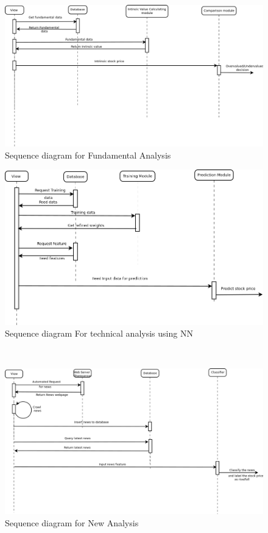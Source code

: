 ~

\begin{figure}[H]\centering
  \includegraphics[width=\textwidth]{fig/fundamental}
  \caption{Sequence diagram for Fundamental Analysis}
  \label{fig:Fundamental}
\end{figure}

\begin{figure}[h!]
  \includegraphics[width=\textwidth]{fig/StockPredictionusingNN}
  \caption{Sequence diagram For technical analysis using NN }
  \label{fig:StockPredictionusingNN}
\end{figure}

~


\begin{figure}[H]\centering
  \includegraphics[width=6in]{fig/newsanalysis}
  \caption{Sequence diagram for New Analysis}
  \label{fig:newsanalysis}
\end{figure}

